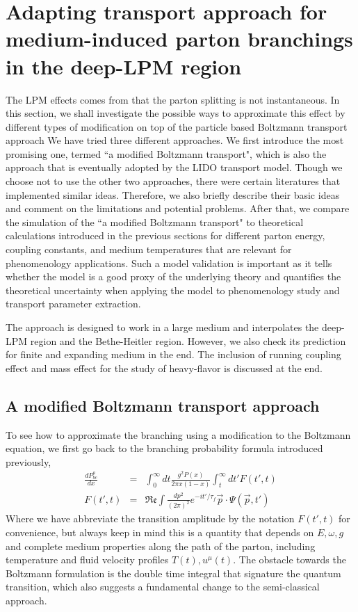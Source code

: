 \section{Adapting transport approach for medium-induced parton branchings in the deep-LPM region}
The LPM effects comes from that the parton splitting is not instantaneous.
In this section, we shall investigate the possible ways to approximate this effect by different types of modification on top of the particle based Boltzmann transport approach
We have tried three different approaches. 
We first introduce the most promising one, termed ``a modified Boltzmann transport", which is also the approach that is eventually adopted by the LIDO transport model.
Though we choose not to use the other two approaches, there were certain literatures that implemented similar ideas.
Therefore, we also briefly describe their basic ideas and comment on the limitations and potential problems.
After that, we compare the simulation of the ``a modified Boltzmann transport" to theoretical calculations introduced in the previous sections for different parton energy, coupling constants, and medium temperatures that are relevant for phenomenology applications.
Such a model validation is important as it tells whether the model is a good proxy of the underlying theory and quantifies the theoretical uncertainty when applying the model to phenomenology study and transport parameter extraction.

The approach is designed to work in a large medium and interpolates the deep-LPM region and the Bethe-Heitler region.
However, we also check its prediction for finite and expanding medium in the end.
The inclusion of running coupling effect and mass effect for the study of heavy-flavor is discussed at the end.

\subsection{A modified Boltzmann transport approach}
To see how to approximate the branching using a modification to the Boltzmann equation, we first go back to the branching probability formula introduced previously,
\begin{eqnarray}
\frac{dP^{a}_{bc}}{dx} &=& \int_0^\infty dt \frac{g^2 P(x)}{2\pi x (1-x) } \int_t^\infty dt'  F(t', t)
\label{eq:full-theory}
\\
F(t', t) &=& \mathfrak{Re} \int \frac{dp^2}{(2\pi)^2} e^{-it'/\tau_f} \vec{p}\cdot \Psi(\vec{p}, t')
\end{eqnarray}
Where we have abbreviate the transition amplitude by the notation $F(t', t)$ for convenience, but always keep in mind this is a quantity that depends on $E, \omega, g$ and complete medium properties along the path of the parton, including temperature and fluid velocity profiles $T(t), u^\mu(t)$.
The obstacle towards the Boltzmann formulation is the double time integral that signature the quantum transition, which also suggests a fundamental change to the semi-classical approach.

